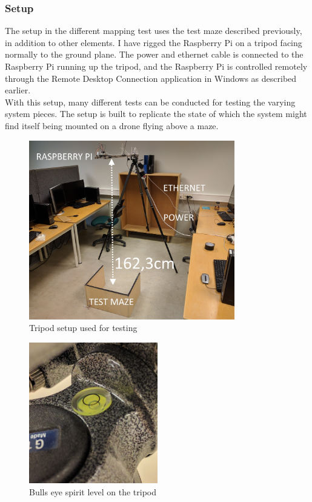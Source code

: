 \subsubsection{Setup}
The setup in the different mapping test uses the test maze described previously, in addition to other elements. I have rigged the Raspberry Pi on a tripod facing normally to the ground plane. The power and ethernet cable is connected to the Raspberry Pi running up the tripod, and the Raspberry Pi is controlled remotely through the Remote Desktop Connection application in Windows as described earlier.\\

With this setup, many different tests can be conducted for testing the varying system pieces. The setup is built to replicate the state of which the system might find itself being mounted on a drone flying above a maze.

\begin{figure}[H]
\centering
\includegraphics[width=0.8\textwidth]{fig/mapping_setup}
  \caption{Tripod setup used for testing}
  \label{fig:tripod}
\end{figure}
\begin{figure}[H]
\centering
\includegraphics[width=0.5\textwidth]{fig/vater}
  \caption{Bulls eye spirit level on the tripod}
  \label{fig:vater}
\end{figure}



